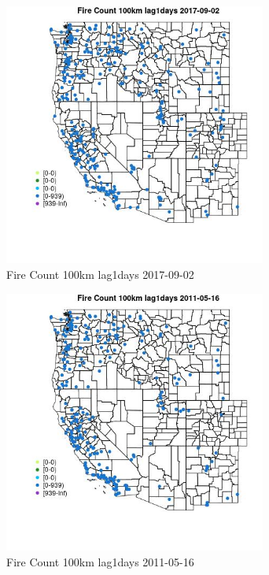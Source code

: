 \begin{figure} 
\centering  
\includegraphics[width=0.77\textwidth]{Code_Outputs/Report_ML_input_PM25_Step4_part_e_de_duplicated_aves_compiled_2019-05-20wNAs_MapObsFire_Count_100km_lag1days2017-09-02.jpg} 
\caption{\label{fig:Report_ML_input_PM25_Step4_part_e_de_duplicated_aves_compiled_2019-05-20wNAsMapObsFire_Count_100km_lag1days2017-09-02}Fire Count 100km lag1days 2017-09-02} 
\end{figure} 
 

\begin{figure} 
\centering  
\includegraphics[width=0.77\textwidth]{Code_Outputs/Report_ML_input_PM25_Step4_part_e_de_duplicated_aves_compiled_2019-05-20wNAs_MapObsFire_Count_100km_lag1days2011-05-16.jpg} 
\caption{\label{fig:Report_ML_input_PM25_Step4_part_e_de_duplicated_aves_compiled_2019-05-20wNAsMapObsFire_Count_100km_lag1days2011-05-16}Fire Count 100km lag1days 2011-05-16} 
\end{figure} 
 

